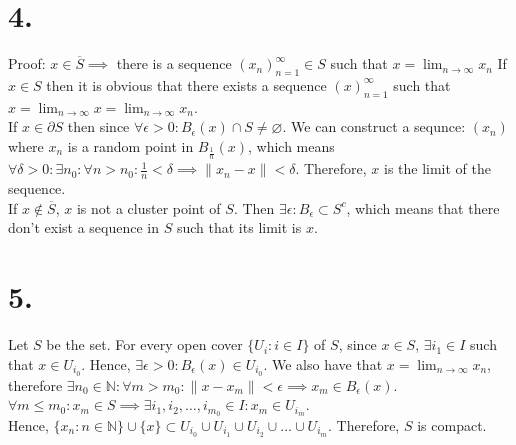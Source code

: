 \documentclass[11pt]{article}
\begin{document}
\section*{4.}
Proof: $x \in \overline{S} \implies $ there is a sequence $(x_n)_{n=1}^\infty \in S$ such that $x = \lim_{n \to \infty}x_n$
If $x \in S$ then it is obvious that there exists a sequence $(x)_{n=1}^\infty$ such that $x =  \lim_{n \to \infty}x = \lim_{n \to \infty}x_n$. \\
If $x \in \partial S$ then since $\forall \epsilon >0: B_\epsilon(x) \cap S \ne \varnothing$. We can construct a sequnce: $(x_n)$ where $x_n$ is a random point in $B_\frac{1}{n}(x)$, which means $\forall \delta >0: \exists n_0: \forall n>n_0: \frac{1}{n} < \delta \implies \|x_n -x\| < \delta$. Therefore, $x$ is the limit of the sequence. \\
If $x \notin \overline{S}$, $x$ is not a cluster point of $S$. Then $\exists \epsilon: B_\epsilon \subset S^c$, which means that there don't exist a sequence in $S$  such that its limit is $x$. 
\pagebreak
\section*{5.}
Let $S$ be the set.
For every open cover $\{U_i: i \in I\}$ of $S$, since $x \in S$, $\exists i_1 \in I$ such that $x \in U_{i_0}$. Hence, $\exists \epsilon >0: B_\epsilon(x) \in U_{i_0}$. We also have that $x = \lim_{n \to \infty}x_n$, therefore $\exists n_0 \in \mathbb{N}: \forall m > m_0: \|x- x_m\| < \epsilon \implies x_m \in B_\epsilon(x)$. \\
$\forall m \le m_0: x_m \in S \implies \exists i_1,i_2,\ldots,i_{m_0} \in I: x_m \in U_{i_m}$. \\
Hence, $\{x_n: n \in \mathbb{N}\} \cup \{x\} \subset U_{i_0} \cup U_{i_1} \cup U_{i_2} \cup \ldots \cup U_{i_m}$. 
Therefore, $S$ is compact. 
\pagebreak
\end{document}
